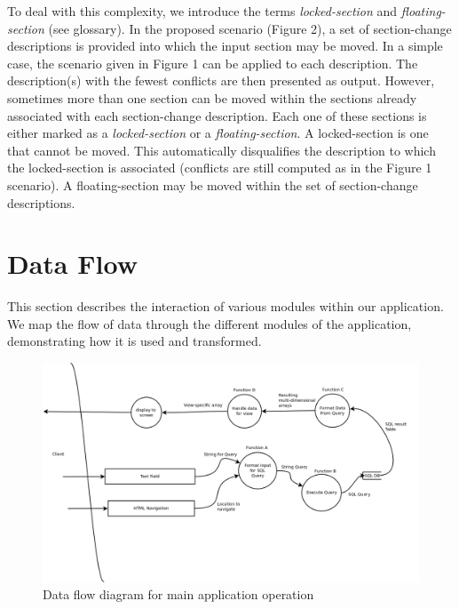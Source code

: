 \documentclass[11pt]{article}
\begin{document}
To deal with this complexity, we introduce the terms \textit{locked-section} and \textit{floating-section} (see glossary). In the proposed
scenario (Figure 2), a set of section-change descriptions is provided into which the input section may be moved. In a simple case, the scenario
given in Figure 1 can be applied to each description. The description(s) with the fewest conflicts are then presented as output. However, sometimes
more than one section can be moved within the sections already associated with each section-change description. Each one of these sections is either marked
as a \textit{locked-section} or a \textit{floating-section}. A locked-section is one that cannot be moved. This automatically disqualifies the description to
which the locked-section is associated (conflicts are still computed as in the Figure 1 scenario). A floating-section may be moved within the set of 
section-change descriptions.

\pagebreak[4]

\section{Data Flow} \label{sec:dataflow}

This section describes the interaction of various modules within our application. We map the flow of data through the different
modules of the application, demonstrating how it is used and transformed.

\begin{figure}[h]
  \centering
  \includegraphics[width=1\textwidth,scale=1.5]{diagrams/dataflow.png}
  \caption{Data flow diagram for main application operation}
\end{figure}
\end{document}
